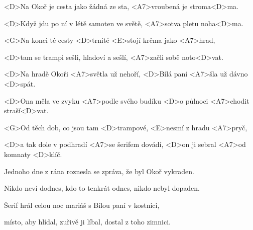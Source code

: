

\zs
<D>Na Okoř je cesta jako žádná ze sta, <A7>vroubená je stroma<D>ma.

<D>Když jdu po ní v létě samoten ve světě, <A7>sotva pletu noha<D>ma.

<G>Na konci té cesty <D>trnité <E>stojí krčma jako <A7>hrad,

<D>tam se trampi sešli, hladoví a sešlí, <A7>začli sobě noto<D>vat.
\ks

\zr
<D>Na hradě Okoři <A7>světla už nehoří, <D>Bílá paní <A7>šla už dávno <D>spát.

<D>Ona měla ve zvyku <A7>podle svého budíku <D>o půlnoci <A7>chodit straší<D>vat.

<G>Od těch dob, co jsou tam <D>trampové, <E>nesmí z hradu <A7>pryč,

<D>a tak dole v podhradí <A7>se šerifem dovádí, <D>on ji sebral <A7>od komnaty <D>klíč.
\kr

\zs
Jednoho dne z rána roznesla se zpráva, že byl Okoř vykraden.

Nikdo neví dodnes, kdo to tenkrát odnes, nikdo nebyl dopaden.

Šerif hrál celou noc mariáš s Bílou paní v kostnici,

místo, aby hlídal, zuřivě ji líbal, dostal z toho zimnici.
\ks

\zr \kr

\kp
